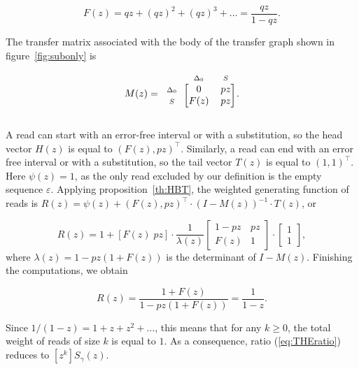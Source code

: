 \documentclass{article}
\newcommand{\smS}{\scriptstyle{S}}
\newcommand{\smDELz}{\scriptstyle{\Delta_0}}
\begin{document}
\begin{equation}
\label{eq:Fsub}
F(z) = qz + (qz)^2 + (qz)^3 + \ldots = \frac{qz}{1-qz}.
\end{equation}

The transfer matrix associated with the body of the transfer graph shown
in figure~\ref{fig:subonly} is

\begin{equation*}
M(z) = 
\begin{blockarray}{ccc}
       & \smDELz & \smS \\
\begin{block}{c[cc]}
\smDELz & 0    & pz \\
\smS    & F(z) & pz \\
\end{block}
\end{blockarray}.
\end{equation*}


A read can start with an error-free interval or with a substitution, so
the head vector $H(z)$ is equal to $(F(z), pz)^\top$. Similarly, a read
can end with an error free interval or with a substitution, so the tail
vector $T(z)$ is equal to $(1,1)^\top$. Here $\psi(z) = 1$, as the only
read excluded by our definition is the empty sequence $\varepsilon$.
Applying proposition~\ref{th:HBT}, the weighted generating function of
reads is $R(z) = \psi(z) + (F(z), pz)^\top \cdot (I-M(z))^{-1} \cdot
T(z)$, or

\begin{equation*}
R(z) = 1 + [F(z) \; pz] \cdot
\frac{1}{\lambda(z)}
\begin{bmatrix}
1-pz & pz   \\
F(z) & 1
\end{bmatrix}
\cdot \begin{bmatrix}1 \\ 1\end{bmatrix},
\end{equation*}
where $\lambda(z) = 1-pz(1+F(z))$ is the determinant of $I-M(z)$.
Finishing the computations, we obtain

\begin{equation}
\label{eq:Rsub}
R(z) = \frac{1+F(z)}{1-pz(1+F(z))} = \frac{1}{1-z}.
\end{equation}

Since $1/(1-z) = 1+z+z^2 + \ldots$, this means that for any $k \geq 0$,
the total weight of reads of size $k$ is equal to $1$. As a consequence,
ratio (\ref{eq:THEratio}) reduces to $[z^k]S_\gamma(z)$.
\end{document}
